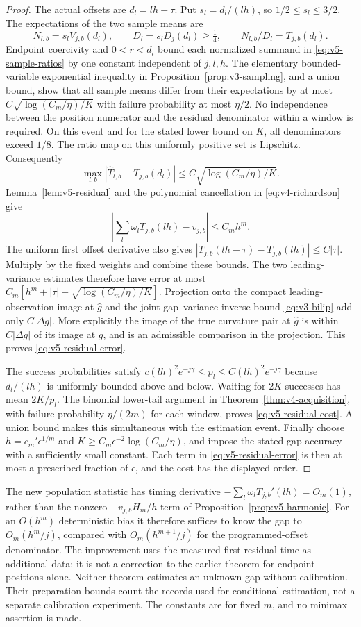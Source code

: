 \begin{proof}
The actual offsets are $d_l=lh-\tau$. Put $s_l=d_l/(lh)$, so
$1/2\le s_l\le3/2$. The expectations of the two sample means are
\[
 N_{l,b}=s_lV_{j,b}(d_l),\qquad
 D_l=s_lD_j(d_l)\ge\tfrac14,
 \qquad N_{l,b}/D_l=T_{j,b}(d_l).
\]
Endpoint coercivity and $0<r<d_l$ bound each normalized summand
in \eqref{eq:v5-sample-ratios} by one constant independent of $j,l,h$.
The elementary bounded-variable exponential inequality in
Proposition~\ref{prop:v3-sampling}, and a union bound, show that all
sample means differ from their expectations by at most
$C\sqrt{\log(C_m/\eta)/K}$ with failure probability at most
$\eta/2$. No independence between the position numerator and the
residual denominator within a window is required. On this event and
for the stated lower bound on $K$, all denominators exceed $1/8$.
The ratio map on this uniformly positive set is Lipschitz. Consequently
\[
 \max_{l,b}|\widehat T_{l,b}-T_{j,b}(d_l)|
       \le C\sqrt{\log(C_m/\eta)/K}.
\]
Lemma~\ref{lem:v5-residual} and the polynomial cancellation in
\eqref{eq:v4-richardson} give
\[
 \left|\sum_l\omega_l T_{j,b}(lh)-v_{j,b}\right|\le C_m h^m.
\]
The uniform first offset derivative also gives
$|T_{j,b}(lh-\tau)-T_{j,b}(lh)|\le C|\tau|$.
Multiply by the fixed weights and combine these bounds. The two
leading-variance estimates therefore have error at most
$C_m[h^m+|\tau|+\sqrt{\log(C_m/\eta)/K}]$.
Projection onto the compact leading-observation image at
$\widehat g$ and the joint gap--variance inverse bound
\eqref{eq:v3-bilip} add only $C|\Delta g|$. More explicitly the
image of the true curvature pair at $\widehat g$ is within
$C|\Delta g|$ of its image at $g$, and is an admissible comparison
in the projection. This proves \eqref{eq:v5-residual-error}.

The success probabilities satisfy
$c(lh)^2e^{-j\gamma}\le p_l\le C(lh)^2e^{-j\gamma}$ because
$d_l/(lh)$ is uniformly bounded above and below. Waiting for $2K$
successes has mean $2K/p_l$. The binomial lower-tail argument in
Theorem~\ref{thm:v4-acquisition}, with failure probability
$\eta/(2m)$ for each window, proves \eqref{eq:v5-residual-cost}.
A union bound makes this simultaneous with the estimation event.
Finally choose $h=c_m'\epsilon^{1/m}$ and
$K\ge C_m\epsilon^{-2}\log(C_m/\eta)$, and impose the stated gap
accuracy with a sufficiently small constant. Each term in
\eqref{eq:v5-residual-error} is then at most a prescribed fraction
of $\epsilon$, and the cost has the displayed order.
\end{proof}

The new population statistic has timing derivative
$-\sum_l\omega_lT_{j,b}'(lh)=O_m(1)$, rather than the nonzero
$-v_{j,b}H_m/h$ term of
Proposition~\ref{prop:v5-harmonic}. For an $O(h^m)$ deterministic
bias it therefore suffices to know the gap to $O_m(h^m/j)$, compared
with $O_m(h^{m+1}/j)$ for the programmed-offset denominator. The
improvement uses the measured first residual time as additional data;
it is not a correction to the earlier theorem for endpoint positions
alone. Neither theorem estimates an unknown gap without calibration.
Their preparation bounds count the records used for conditional
estimation, not a separate calibration experiment. The constants are
for fixed $m$, and no minimax assertion is made.
